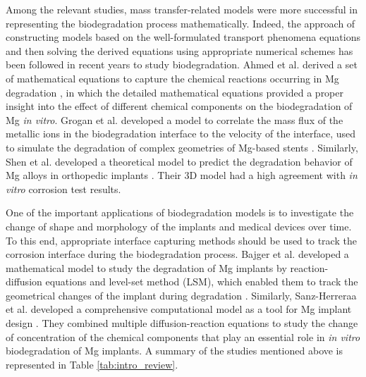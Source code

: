 Among the relevant studies, mass transfer-related models were more successful in representing the biodegradation process mathematically. Indeed, the approach of constructing models based on the well-formulated transport phenomena equations and then solving the derived equations using appropriate numerical schemes has been followed in recent years to study biodegradation. Ahmed et al. derived a set of mathematical equations to capture the chemical reactions occurring in Mg degradation \cite{Ahmed2017}, in which the detailed mathematical equations provided a proper insight into the effect of different chemical components on the biodegradation of Mg \textit{in vitro}. Grogan et al. developed a model to correlate the mass flux of the metallic ions in the biodegradation interface to the velocity of the interface, used to simulate the degradation of complex geometries of Mg-based stents \cite{Grogan2014}. Similarly, Shen et al. developed a theoretical model to predict the degradation behavior of Mg alloys in orthopedic implants \cite{Shen2019}. Their 3D model had a high agreement with \textit{in vitro} corrosion test results.


One of the important applications of biodegradation models is to investigate the change of shape and morphology of the implants and medical devices over time. To this end, appropriate interface capturing methods should be used to track the corrosion interface during the biodegradation process. Bajger et al. developed a mathematical model to study the degradation of Mg implants by reaction-diffusion equations and level-set method (\gls{LSM}), which enabled them to track the geometrical changes of the implant during degradation \cite{Bajger2016}. Similarly, Sanz-Herreraa et al. developed a comprehensive computational model as a tool for Mg implant design \cite{Sanz-Herrera2018}. They combined multiple diffusion-reaction equations to study the change of concentration of the chemical components that play an essential role in \textit{in vitro} biodegradation of Mg implants. A summary of the studies mentioned above is represented in Table \ref{tab:intro_review}. 


